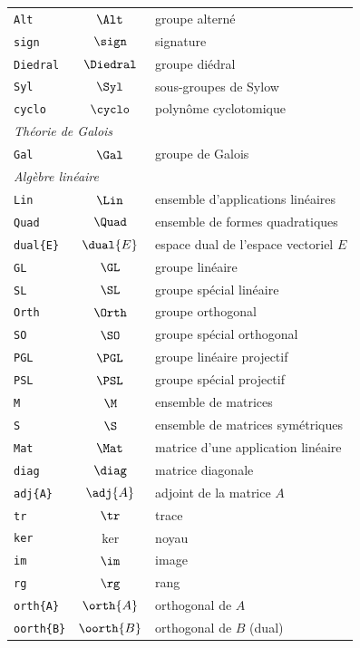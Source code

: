 \documentclass[print]{atomathematyk}
\begin{document}
\begin{longtable}{lcl}
  \texttt{Alt} & \(\Alt\) & groupe alterné\\
  \texttt{sign} & \(\sign\) & signature\\
  \texttt{Diedral} & \(\Diedral\) & groupe diédral\\
  \texttt{Syl} & \(\Syl\) & sous-groupes de Sylow\\
  \texttt{cyclo} & \(\cyclo\) & polynôme cyclotomique\\
  \multicolumn{3}{l}{\emph{Théorie de Galois}}\\
  \texttt{Gal} & \(\Gal\) & groupe de Galois\\
  \multicolumn{3}{l}{\emph{Algèbre linéaire}}\\
  \texttt{Lin} & \(\Lin\) & ensemble d’applications linéaires\\
  \texttt{Quad} & \(\Quad\) & ensemble de formes quadratiques\\
  \texttt{dual\{E\}} & \(\dual{E}\) & espace dual de l’espace vectoriel \(E\)\\
  \texttt{GL} & \(\GL\) & groupe linéaire\\
  \texttt{SL} & \(\SL\) & groupe spécial linéaire\\
  \texttt{Orth} & \(\Orth\) & groupe orthogonal\\
  \texttt{SO} & \(\SO\) & groupe spécial orthogonal\\
  \texttt{PGL} & \(\PGL\) & groupe linéaire projectif\\
  \texttt{PSL} & \(\PSL\) & groupe spécial projectif\\
  \texttt{M} & \(\M\) & ensemble de matrices\\
  \texttt{S} & \(\S\) & ensemble de matrices symétriques\\
  \texttt{Mat} & \(\Mat\) & matrice d’une application linéaire\\
  \texttt{diag} & \(\diag\) & matrice diagonale\\
  \texttt{adj\{A\}} & \(\adj{A}\) & adjoint de la matrice \(A\)\\
  \texttt{tr} & \(\tr\) & trace\\
  \texttt{ker} & \(\ker\) & noyau\\
  \texttt{im} & \(\im\) & image\\
  \texttt{rg} & \(\rg\) & rang\\
  \texttt{orth\{A\}} & \(\orth{A}\) & orthogonal de \(A\)\\
  \texttt{oorth\{B\}} & \(\oorth{B}\) & orthogonal de \(B\) (dual)\\

\end{longtable}
\end{document}
